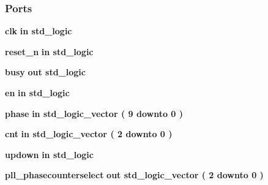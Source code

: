 \subsubsection*{Ports}
 \begin{DoxyCompactItemize}
\item 
{\bf clk}  {\bfseries {\bfseries \textcolor{keywordflow}{in}\textcolor{vhdlchar}{ }}} {\bfseries \textcolor{comment}{std\+\_\+logic}\textcolor{vhdlchar}{ }} 
\item 
{\bf reset\+\_\+n}  {\bfseries {\bfseries \textcolor{keywordflow}{in}\textcolor{vhdlchar}{ }}} {\bfseries \textcolor{comment}{std\+\_\+logic}\textcolor{vhdlchar}{ }} 
\item 
{\bf busy}  {\bfseries {\bfseries \textcolor{keywordflow}{out}\textcolor{vhdlchar}{ }}} {\bfseries \textcolor{comment}{std\+\_\+logic}\textcolor{vhdlchar}{ }} 
\item 
{\bf en}  {\bfseries {\bfseries \textcolor{keywordflow}{in}\textcolor{vhdlchar}{ }}} {\bfseries \textcolor{comment}{std\+\_\+logic}\textcolor{vhdlchar}{ }} 
\item 
{\bf phase}  {\bfseries {\bfseries \textcolor{keywordflow}{in}\textcolor{vhdlchar}{ }}} {\bfseries \textcolor{comment}{std\+\_\+logic\+\_\+vector}\textcolor{vhdlchar}{ }\textcolor{vhdlchar}{(}\textcolor{vhdlchar}{ }\textcolor{vhdlchar}{ } \textcolor{vhdldigit}{9} \textcolor{vhdlchar}{ }\textcolor{keywordflow}{downto}\textcolor{vhdlchar}{ }\textcolor{vhdlchar}{ } \textcolor{vhdldigit}{0} \textcolor{vhdlchar}{ }\textcolor{vhdlchar}{)}\textcolor{vhdlchar}{ }} 
\item 
{\bf cnt}  {\bfseries {\bfseries \textcolor{keywordflow}{in}\textcolor{vhdlchar}{ }}} {\bfseries \textcolor{comment}{std\+\_\+logic\+\_\+vector}\textcolor{vhdlchar}{ }\textcolor{vhdlchar}{(}\textcolor{vhdlchar}{ }\textcolor{vhdlchar}{ } \textcolor{vhdldigit}{2} \textcolor{vhdlchar}{ }\textcolor{keywordflow}{downto}\textcolor{vhdlchar}{ }\textcolor{vhdlchar}{ } \textcolor{vhdldigit}{0} \textcolor{vhdlchar}{ }\textcolor{vhdlchar}{)}\textcolor{vhdlchar}{ }} 
\item 
{\bf updown}  {\bfseries {\bfseries \textcolor{keywordflow}{in}\textcolor{vhdlchar}{ }}} {\bfseries \textcolor{comment}{std\+\_\+logic}\textcolor{vhdlchar}{ }} 
\item 
{\bf pll\+\_\+phasecounterselect}  {\bfseries {\bfseries \textcolor{keywordflow}{out}\textcolor{vhdlchar}{ }}} {\bfseries \textcolor{comment}{std\+\_\+logic\+\_\+vector}\textcolor{vhdlchar}{ }\textcolor{vhdlchar}{(}\textcolor{vhdlchar}{ }\textcolor{vhdlchar}{ } \textcolor{vhdldigit}{2} \textcolor{vhdlchar}{ }\textcolor{keywordflow}{downto}\textcolor{vhdlchar}{ }\textcolor{vhdlchar}{ } \textcolor{vhdldigit}{0} \textcolor{vhdlchar}{ }\textcolor{vhdlchar}{)}\textcolor{vhdlchar}{ }} 

\end{DoxyCompactItemize}
